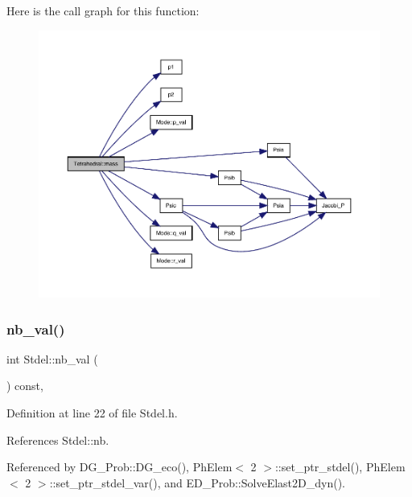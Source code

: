 Here is the call graph for this function\+:
\nopagebreak
\begin{figure}[H]
\begin{center}
\leavevmode
\includegraphics[width=350pt]{classTetrahedral_a0ac27c7dabcc007ef5a2acaa3cfe789d_cgraph}
\end{center}
\end{figure}
\mbox{\label{classStdel_a4fb0a049dc27d8e67665a56d1b5a18ba}} 
\subsubsection{\texorpdfstring{nb\+\_\+val()}{nb\_val()}}
{\footnotesize\ttfamily int Stdel\+::nb\+\_\+val (\begin{DoxyParamCaption}{ }\end{DoxyParamCaption}) const\hspace{0.3cm}{\ttfamily [inline]}, {\ttfamily [inherited]}}



Definition at line 22 of file Stdel.\+h.



References Stdel\+::nb.



Referenced by D\+G\+\_\+\+Prob\+::\+D\+G\+\_\+eco(), Ph\+Elem$<$ 2 $>$\+::set\+\_\+ptr\+\_\+stdel(), Ph\+Elem$<$ 2 $>$\+::set\+\_\+ptr\+\_\+stdel\+\_\+var(), and E\+D\+\_\+\+Prob\+::\+Solve\+Elast2\+D\+\_\+dyn().

